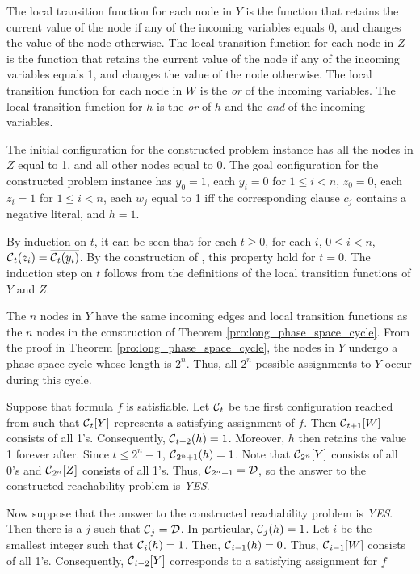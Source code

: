 The local transition function for each node in $Y$ is the function 
that retains the current value of the node if any of the incoming variables equals 0,
and changes the value of the node otherwise.
The local transition function for each node in $Z$ is the function 
that retains the current value of the node if any of the incoming variables equals 1,
and changes the value of the node otherwise.
The local transition function for each node in $W$ is the {\em or} of the incoming variables.
The local transition function for $h$ is the {\em or} of $h$
and the {\em and} of the incoming variables.

The initial configuration \calc{} for the constructed problem instance
 has all the nodes in $Z$ equal to 1, and all other nodes equal to 0.
The goal configuration \cald{} for the constructed problem instance 
has $y_0 = 1$,  each  $y_i= 0$ for $1 \leq i <n$, $z_0 = 0$,  each  $z_i= 1$ for $1 \leq i <n$,
each $w_j$ equal to 1 iff the corresponding clause $c_j$ contains a negative literal,
and $h = 1$.

By induction on $t$, it can be seen that for each $t \geq 0$,
for each $i$, $0 \leq i < n$, 
$\mbox{$\mathcal{C}$}_t(z_i) = \overline{\mbox{$\mathcal{C}$}_t(y_i)}$.
By the construction of \calc{}, this property hold for $t = 0$.
The induction step on $t$ follows from the definitions of the local transition functions of $Y$ and $Z$.

The $n$ nodes in $Y$ have the same incoming edges and local transition functions 
as the $n$ nodes in the construction of Theorem \ref{pro:long_phase_space_cycle}.
From the proof in Theorem \ref{pro:long_phase_space_cycle}, 
the nodes in $Y$ undergo a phase space cycle whose length is $2^n$.
Thus, all $2^n$ possible assignments to $Y$ occur during this cycle.

Suppose that formula $f$ is satisfiable. 
Let $\mbox{$\mathcal{C}$}_t$ be the first configuration reached from \calc{} such that
$\mbox{$\mathcal{C}$}_t[Y]$ represents a satisfying assignment of $f$.
Then $\mbox{$\mathcal{C}$}_{t+1}[W]$ consists of all 1's.
Consequently, $\mbox{$\mathcal{C}$}_{t+2}(h) = 1$. 
Moreover, $h$ then retains the value 1 forever after.
Since $t \leq 2^n-1$, $\mbox{$\mathcal{C}$}_{2^n+1}(h) = 1$.
Note that $\mbox{$\mathcal{C}$}_{2^n}[Y]$ consists of all 0's and $\mbox{$\mathcal{C}$}_{2^n}[Z]$ consists of all 1's.
Thus, $\mbox{$\mathcal{C}$}_{2^n+1} = \mbox{$\mathcal{D}$}$, so the answer to the constructed reachability problem is {\em YES}.

Now suppose that the answer to the constructed reachability problem is {\em YES}.
Then there is a $j$ such that $\mbox{$\mathcal{C}$}_j = \mbox{$\mathcal{D}$}$. 
In particular, $\mbox{$\mathcal{C}$}_j(h) = 1$.
Let $i$ be the smallest integer such that $\mbox{$\mathcal{C}$}_i(h) = 1$.
Then, $\mbox{$\mathcal{C}$}_{i-1}(h) = 0$.
Thus, $\mbox{$\mathcal{C}$}_{i-1}[W]$ consists of all 1's.
Consequently, $\mbox{$\mathcal{C}$}_{i-2}[Y]$ corresponds to a satisfying assignment for $f$

